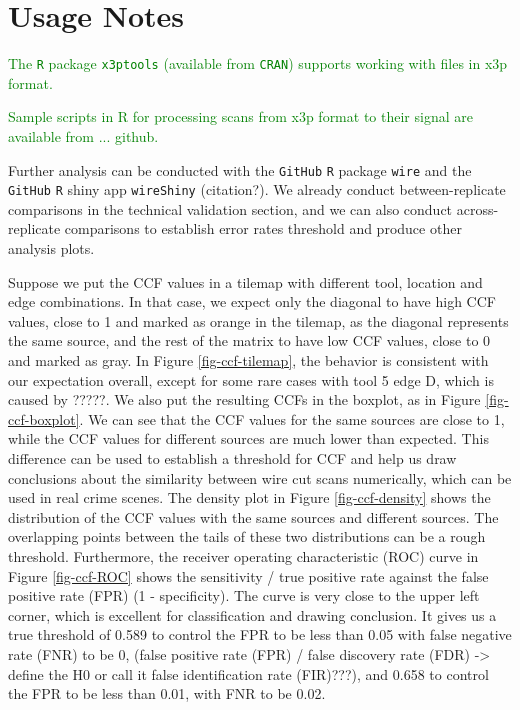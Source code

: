 \documentclass[fleqn,10pt]{wlscirep}
\newcommand{\tom}[1]{{\textcolor{RedOrange}{#1}}}
\newcommand{\hh}[1]{{\textcolor{Green}{#1}}}
\begin{document}
\section{Usage Notes}\label{sec-usage-notes}

\hh{The \texttt{R} package \texttt{x3ptools} (available from \texttt{CRAN}) supports working with files in  x3p format. }

\hh{Sample scripts in R for processing scans from x3p format to their signal are available from ... github. }

Further analysis can be conducted with the \texttt{GitHub} \texttt{R}
package \texttt{wire} and the \texttt{GitHub} \texttt{R} shiny app
\texttt{wireShiny} \tom{(citation?)}. We already conduct
between-replicate comparisons in the technical validation section, and
we can also conduct across-replicate comparisons to establish error
rates threshold and produce other analysis plots.

Suppose we put the CCF values in a tilemap with different tool, location
and edge combinations. In that case, we expect only the diagonal to have
high CCF values, close to 1 and marked as orange in the tilemap, as the
diagonal represents the same source, and the rest of the matrix to have
low CCF values, close to 0 and marked as gray. In Figure
\ref{fig-ccf-tilemap}, the behavior is consistent with our expectation
overall, except for some rare cases with tool 5 edge D, which is caused
by \tom{?????}. We also put the resulting CCFs in the boxplot, as in
Figure \ref{fig-ccf-boxplot}. We can see that the CCF values for the
same sources are close to 1, while the CCF values for different sources
are much lower than expected. This difference can be used to establish a
threshold for CCF and help us draw conclusions about the similarity
between wire cut scans numerically, which can be used in real crime
scenes. The density plot in Figure \ref{fig-ccf-density} shows the
distribution of the CCF values with the same sources and different
sources. The overlapping points between the tails of these two
distributions can be a rough threshold. Furthermore, the receiver
operating characteristic (ROC) curve in Figure \ref{fig-ccf-ROC} shows
the sensitivity / true positive rate against the false positive rate
(FPR) (1 - specificity). The curve is very close to the upper left
corner, which is excellent for classification and drawing conclusion. It
gives us a true threshold of 0.589 to control the FPR to be less than
0.05 with false negative rate (FNR) to be 0,
\tom{(false positive rate (FPR) / false discovery rate (FDR) -> define the H0 or call it false identification rate (FIR)???)},
and 0.658 to control the FPR to be less than 0.01, with FNR to be 0.02.
\end{document}
